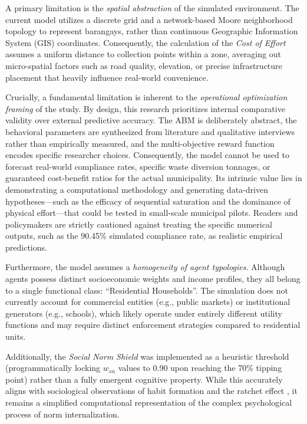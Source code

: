 A primary limitation is the \textit{spatial abstraction} of the simulated environment. The current model utilizes a discrete grid and a network-based Moore neighborhood topology to represent barangays, rather than continuous Geographic Information System (GIS) coordinates. Consequently, the calculation of the \textit{Cost of Effort} assumes a uniform distance to collection points within a zone, averaging out micro-spatial factors such as road quality, elevation, or precise infrastructure placement that heavily influence real-world convenience.

Crucially, a fundamental limitation is inherent to the \textit{operational optimization framing} of the study. By design, this research prioritizes internal comparative validity over external predictive accuracy. The ABM is deliberately abstract, the behavioral parameters are synthesized from literature and qualitative interviews rather than empirically measured, and the multi-objective reward function encodes specific researcher choices. Consequently, the model cannot be used to forecast real-world compliance rates, specific waste diversion tonnages, or guaranteed cost-benefit ratios for the actual municipality. Its intrinsic value lies in demonstrating a computational methodology and generating data-driven hypotheses—such as the efficacy of sequential saturation and the dominance of physical effort—that could be tested in small-scale municipal pilots. Readers and policymakers are strictly cautioned against treating the specific numerical outputs, such as the 90.45\% simulated compliance rate, as realistic empirical predictions.

Furthermore, the model assumes a \textit{homogeneity of agent typologies}. Although agents possess distinct socioeconomic weights and income profiles, they all belong to a single functional class: ``Residential Households''. The simulation does not currently account for commercial entities (e.g., public markets) or institutional generators (e.g., schools), which likely operate under entirely different utility functions and may require distinct enforcement strategies compared to residential units.

Additionally, the \textit{Social Norm Shield} was implemented as a heuristic threshold (programmatically locking $w_{sn}$ values to 0.90 upon reaching the 70\% tipping point) rather than a fully emergent cognitive property. While this accurately aligns with sociological observations of habit formation and the ratchet effect \citep{Corcoran2020}, it remains a simplified computational representation of the complex psychological process of norm internalization. 


